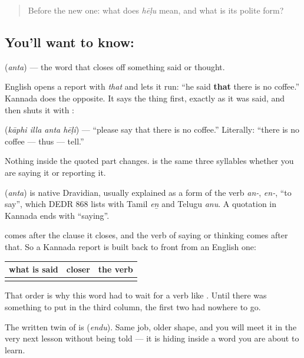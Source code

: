 \begin{quote}
Before the new one: what does \emph{hēḷu} mean, and what is its polite form?
\end{quote}

\subsection*{You'll want to know: }
\textbf{} (\emph{anta}) — the word that closes off something said or thought.

English opens a report with \emph{that} and lets it run: \textquotedblleft{}he said \textbf{that} there is no coffee.\textquotedblright{} Kannada does the opposite. It says the thing first, exactly as it was said, and then shuts it with :

\textbf{   } (\emph{kāphi illa anta hēḷi}) — \textquotedblleft{}please say that there is no coffee.\textquotedblright{} Literally: \textquotedblleft{}there is no coffee — thus — tell.\textquotedblright{}

Nothing inside the quoted part changes.   is the same three syllables whether you are saying it or reporting it.

\begin{cousinweb}
\textbf{} (\emph{anta}) is native Dravidian, usually explained as a form of the verb \emph{an-}, \emph{en-}, \textquotedblleft{}to say\textquotedblright{}, which DEDR 868 lists with Tamil \emph{eṉ} and Telugu \emph{anu}. A quotation in Kannada ends with \textquotedblleft{}saying\textquotedblright{}.
\end{cousinweb}

\begin{grammarlens}[title={Grammar Lens: the quotation closes before the verb arrives}]
 comes after the clause it closes, and the verb of saying or thinking comes after that. So a Kannada report is built back to front from an English one:

\noindent
\begin{tabularx}{\linewidth}{@{}>{\raggedright\arraybackslash}X>{\raggedright\arraybackslash}X>{\raggedright\arraybackslash}X@{}}
\toprule
\textbf{what is said} & \textbf{closer} & \textbf{the verb} \\
\midrule
\kn{ಕಾಫಿ} \kn{ಇಲ್ಲ} & \kn{ಅಂತ} & \kn{ಹೇಳಿ} \\
\bottomrule
\end{tabularx}

That order is why this word had to wait for a verb like . Until there was something to put in the third column, the first two had nowhere to go.

The written twin of  is \textbf{} (\emph{endu}). Same job, older shape, and you will meet it in the very next lesson without being told — it is hiding inside a word you are about to learn.
\end{grammarlens}


